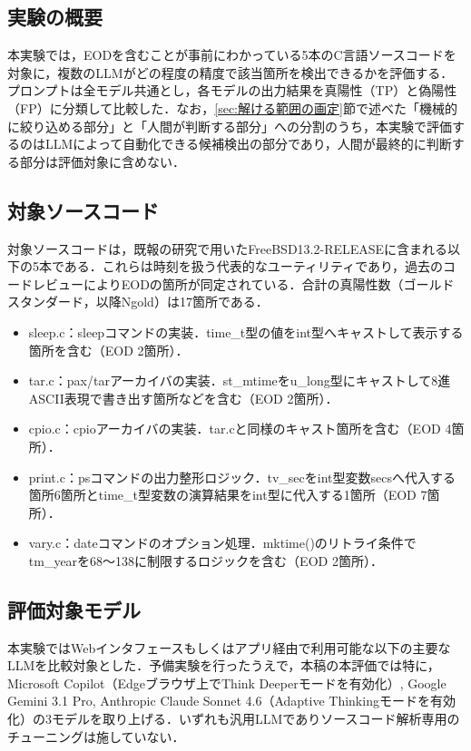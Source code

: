 \documentclass[submit,techrep,noauthor]{ipsj}
\begin{document}
\subsection{実験の概要}

本実験では，EODを含むことが事前にわかっている5本のC言語ソースコードを対象に，複数のLLMがどの程度の精度で該当箇所を検出できるかを評価する．プロンプトは全モデル共通とし，各モデルの出力結果を真陽性（TP）と偽陽性（FP）に分類して比較した．なお，\ref{sec:解ける範囲の画定}節で述べた「機械的に絞り込める部分」と「人間が判断する部分」への分割のうち，本実験で評価するのはLLMによって自動化できる候補検出の部分であり，人間が最終的に判断する部分は評価対象に含めない．

\subsection{対象ソースコード}
\label{sec:対象ソースコード}

対象ソースコードは，既報の研究で用いたFreeBSD13.2-RELEASE\cite{ref3}に含まれる以下の5本である．これらは時刻を扱う代表的なユーティリティであり，過去のコードレビューによりEODの箇所が同定されている．合計の真陽性数（ゴールドスタンダード，以降Ngold）は17箇所である．

\begin{itemize}
	\item sleep.c：sleepコマンドの実装．time\_t型の値をint型へキャストして表示する箇所を含む（EOD 2箇所）．
	\item tar.c：pax/tarアーカイバの実装．st\_mtimeをu\_long型にキャストして8進ASCII表現で書き出す箇所などを含む（EOD 2箇所）．
	\item cpio.c：cpioアーカイバの実装．tar.cと同様のキャスト箇所を含む（EOD 4箇所）．
	\item print.c：psコマンドの出力整形ロジック．tv\_secをint型変数secsへ代入する箇所6箇所とtime\_t型変数の演算結果をint型に代入する1箇所（EOD 7箇所）．
	\item vary.c：dateコマンドのオプション処理．mktime()のリトライ条件でtm\_yearを68～138に制限するロジックを含む（EOD 2箇所）．
\end{itemize}

\subsection{評価対象モデル}

本実験ではWebインタフェースもしくはアプリ経由で利用可能な以下の主要なLLMを比較対象とした．予備実験を行ったうえで，本稿の本評価では特に，Microsoft Copilot（Edgeブラウザ上でThink Deeperモードを有効化）, Google Gemini 3.1 Pro, Anthropic Claude Sonnet 4.6（Adaptive Thinkingモードを有効化）の3モデルを取り上げる．いずれも汎用LLMでありソースコード解析専用のチューニングは施していない．
\end{document}
